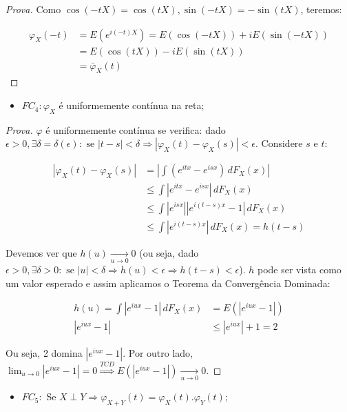 \documentclass[
]{article}
\providecommand{\tightlist}{%
  \setlength{\itemsep}{0pt}\setlength{\parskip}{0pt}}
\theoremstyle{definition}
\theoremstyle{definition}
\theoremstyle{definition}
\theoremstyle{definition}
\theoremstyle{remark}
\begin{document}
\begin{proof}[Prova]
Como \(\cos(-tX) = \cos(tX), \sin(-tX) = -\sin(tX)\), teremos:

\begin{align*}
\varphi_{X}(-t) &= E(e^{i(-t)X}) = E(\cos(-tX)) + iE(\sin(-tX)) \\
&= E(\cos(tX)) - iE(\sin(tX)) \\
&= \bar{\varphi}_{X}(t)
\end{align*}
\end{proof}

\begin{itemize}
\tightlist
\item
  \(FC_{4}: \varphi_{X}\) é uniformemente contínua na reta;
\end{itemize}

\begin{proof}[Prova]
\(\varphi\) é uniformemente contínua se verifica: dado \(\epsilon > 0, \exists \delta = \delta(\epsilon): \text{ se }|t - s| < \delta \Rightarrow |\varphi_{X}(t) - \varphi_{X}(s)| < \epsilon\). Considere \(s\) e \(t\):

\begin{align*}
|\varphi_{X}(t) - \varphi_{X}(s)| &= \left|\int(e^{itx} - e^{isx})\, dF_{X}(x)\right| \\
&\le \int |e^{itx} - e^{isx}|\, dF_{X}(x) \\
&\le \int |e^{isx}||e^{i(t-s)x} - 1|\, dF_{X}(x) \\
&\le \int |e^{i(t-s)x}|\, dF_{X}(x) = h(t-s)
\end{align*}

Devemos ver que \(h(u) \xrightarrow[u \to 0]{}0\) (ou seja, dado \(\epsilon > 0, \exists \delta > 0: \text{ se } |u| < \delta \Rightarrow h(u) < \epsilon \Rightarrow h(t - s) < \epsilon\)). \(h\) pode ser vista como um valor esperado e assim aplicamos o Teorema da Convergência Dominada:

\begin{align*}
h(u) = \int |e^{iux} - 1|\, dF_{X}(x) &= E(|e^{iux} - 1|) \\
|e^{iux} - 1| &\le |e^{iux}| + 1 = 2
\end{align*}

Ou seja, 2 domina \(|e^{iux} - 1|\). Por outro lado, \(\lim_{u \to 0}|e^{iux} - 1| = 0 \stackrel{TCD}{\Rightarrow}E(|e^{iux} - 1|) \xrightarrow[u \to 0]{}0\).
\end{proof}

\begin{itemize}
\tightlist
\item
  \(FC_{5}:\) Se \(X \perp Y \Rightarrow \varphi_{X+Y}(t) = \varphi_{X}(t).\varphi_{Y}(t)\);
\end{itemize}
\end{document}
